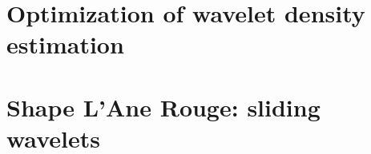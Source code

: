 \documentclass{article}
\begin{document}
  
  
  

\part{Optimization of wavelet density estimation}
  

\part{Shape L'Ane Rouge: sliding wavelets}
  
  

\newpage


\end{document}
